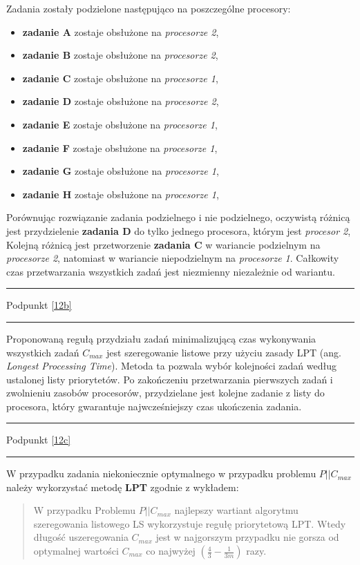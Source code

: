 \documentclass[
    12pt, %
]{../fphw}
\begin{document}
\newpage

Zadania zostały podzielone następująco na poszczególne procesory:
\begin{itemize}
    \item \textbf{zadanie A} zostaje obsłużone na \textit{procesorze 2},
    \item \textbf{zadanie B} zostaje obsłużone na \textit{procesorze 2},
    \item \textbf{zadanie C} zostaje obsłużone na \textit{procesorze 1},
    \item \textbf{zadanie D} zostaje obsłużone na \textit{procesorze 2},
    \item \textbf{zadanie E} zostaje obsłużone na \textit{procesorze 1},
    \item \textbf{zadanie F} zostaje obsłużone na \textit{procesorze 1},
    \item \textbf{zadanie G} zostaje obsłużone na \textit{procesorze 1},
    \item \textbf{zadanie H} zostaje obsłużone na \textit{procesorze 1},
\end{itemize}

Porównując rozwiązanie zadania podzielnego i nie podzielnego,
oczywistą różnicą jest przydzielenie \textbf{zadania D} do tylko jednego procesora,
którym jest \textit{procesor 2},
Kolejną różnicą jest przetworzenie \textbf{zadania C} w wariancie podzielnym
na \textit{procesorze 2}, natomiast w wariancie niepodzielnym na \textit{procesorze 1}.
Całkowity czas przetwarzania wszystkich zadań jest niezmienny niezależnie od wariantu.
\par\noindent\rule{\textwidth}{0.4pt}
    Podpunkt \ref{12b}
\par\noindent\rule{\textwidth}{0.4pt}
Proponowaną regułą przydziału zadań minimalizującą czas wykonywania wszystkich
zadań \(C_{max}\) jest szeregowanie listowe przy użyciu zasady LPT (ang. \textit{Longest Processing Time}).
Metoda ta pozwala wybór kolejności zadań według ustalonej listy priorytetów.
Po zakończeniu przetwarzania pierwszych zadań i zwolnieniu zasobów
procesorów, przydzielane jest kolejne zadanie z listy do procesora, 
który gwarantuje najwcześniejszy czas ukończenia zadania.

\par\noindent\rule{\textwidth}{0.4pt}
    Podpunkt \ref{12c}
\par\noindent\rule{\textwidth}{0.4pt}
W przypadku zadania niekoniecznie optymalnego w przypadku problemu \(P||C_{max}\)
należy wykorzystać metodę \textbf{LPT} zgodnie z wykładem:
\begin{quote}
    W przypadku Problemu \(P ||C_{max}\) najlepszy wartiant algorytmu szeregowania listowego LS wykorzystuje regułę priorytetową LPT. 
    Wtedy długość uszeregowania \(C_{max}\) jest w najgorszym przypadku nie gorsza od optymalnej wartości \(C_{max}\)
    co najwyżej \( (\frac{4}{3} - \frac{1}{3m} )\) razy.
\end{quote}
\end{document}
